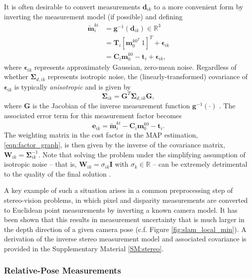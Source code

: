 \documentclass[lettersize,journal]{IEEEtran}
\begin{document}
It is often desirable to convert measurements $ \bm{d}_{ik} $ to a more convenient form by inverting the measurement model (if possible) and defining 
\begin{align}
	\tilde{\bm{m}}_i^{ki} &= \bm{g}^{-1}(\bm{d}_{ik})\in \mathbb{R}^3 \nonumber\\
	&=\bm{T}_i \left[\bm{m}_0^{k0^T} ~ 1\right]^T + \bm{\epsilon}_{ik}\nonumber\\
	&= \bm{C}_i\bm{m}_0^{k0} - \bm{t}_i + \bm{\epsilon}_{ik},
\end{align}
where $\bm{\epsilon}_{ik} $ represents approximately Gaussian, zero-mean noise. Regardless of whether $ \bm{\Sigma}_{d,ik} $ represents isotropic noise, the (linearly-transformed) covariance of $\bm{\epsilon}_{ik} $ is typically \textit{anisotropic} and is given by
\begin{equation}
	\bm{\Sigma}_{ik} = \bm{G}^T \bm{\Sigma}_{d,ik} \bm{G},
\end{equation}
where $\bm{G}$ is the Jacobian of the inverse measurement function $\bm{g}^{-1}(\cdot)$ \cite{matthiesErrorModelingStereo1987}. The associated error term for this measurement factor becomes
\begin{equation}\label{eqn:lm_error_term}
	\bm{e}_{ik} = \tilde{\bm{m}}_i^{ki} - \bm{C}_i\bm{m}_0^{k0} - \bm{t}_i.
\end{equation}
The weighting matrix in the cost factor in the MAP estimation, \eqref{eqn:factor_graph}, is then given by the inverse of the covariance matrix, $ \bm{W}_{ik} = \bm{\Sigma}^{-1}_{ik} $. Note that solving the problem under the simplifying assumption of isotropic noise -- that is, $ \bm{W}_{ik} = \sigma_{ik} \bm{I}$ with $ \sigma_k \in \mathbb{R}$ -- can be extremely detrimental to the quality of the final solution \cite{matthiesErrorModelingStereo1987}. 

A key example of such a situation arises in a common preprocessing step of stereo-vision problems, in which pixel and disparity measurements are converted to Euclidean point measurements by inverting a known camera model.  It has been shown that this results in measurement uncertainty that is much larger in the depth direction of a given camera pose \cite{matthiesErrorModelingStereo1987,barfootPoseEstimationUsing2011} (c.f. Figure \ref{fig:slam_local_min}). A derivation of the inverse stereo measurement model and associated covariance is provided in the Supplementary Material \ref{SM:stereo}. 

\subsubsection{Relative-Pose Measurements}\label{sec:RelPoseMeas}
\end{document}
